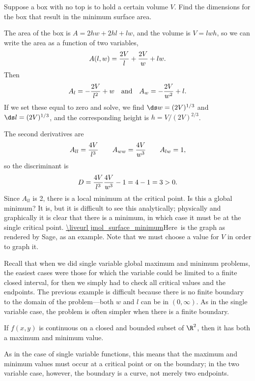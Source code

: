 \begin{example} Suppose a box with no top is to hold a certain volume $V$. Find
the dimensions for the box that result in the minimum surface area.

The area of the box is $A=2hw+2hl+lw$, and the volume is $V=lwh$, so
we can write the area as a function of two variables,
$$A(l,w)={2V\over l}+{2V\over w}+lw.$$
Then
$$A_l=-{2V\over l^2}+w \hbox{\quad and\quad} A_w=-{2V\over w^2}+l.$$
If we set these equal to zero and solve, we find
$\ds w=(2V)^{1/3}$ and $\ds l=(2V)^{1/3}$, and the corresponding
height is $h=V/(2V)^{2/3}$.

The second derivatives are
$$A_{ll}={4V\over l^3}\qquad A_{ww}={4V\over w^3}\qquad
A_{lw}=1,$$
so the discriminant is
$$D={4V\over l^3}{4V\over w^3}-1=4-1=3>0.$$
Since $A_{ll}$ is 2, there is a local minimum at the critical point.
Is this a global minimum? It is, but it is difficult to see this
analytically; physically and graphically it is clear that there is a
minimum, in which case it must be at the single critical point. 
\expandafter\url\expandafter{\liveurl jmol_surface_minimum}Here\endurl\ 
is the graph as rendered by Sage, as an example. Note that we must
choose a value for $V$ in order to graph it.
\end{example}

Recall that when we did single variable global maximum and minimum
problems, the easiest cases were those for which the variable could be
limited to a finite closed interval, for then we simply had to check
all critical values and the endpoints. The previous example is
difficult because there is no finite boundary to the domain of the
problem---both $w$ and $l$ can be in $(0,\infty)$. As in the single
variable case, the problem is often simpler when there is a finite
boundary. 

\begin{theorem} If $f(x,y)$ is continuous on a closed and bounded subset of
$\R^2$, then it has both a maximum and minimum value.
\end{theorem}

As in the case of single variable functions, this means that the
maximum and minimum values must occur at a critical point or on the
boundary; in the two variable case, however, the boundary is a curve,
not merely two endpoints.

